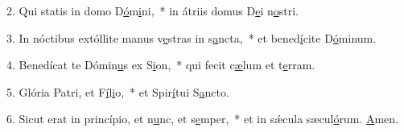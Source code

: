 2. Qui statis in domo D\uline{ó}m\uline{i}ni,~* in átriis domus D\uline{e}i n\uline{o}stri.\par 
3. In nóctibus extóllite manus v\uline{e}stras in s\uline{a}ncta,~* et bened\uline{í}cite D\uline{ó}minum.\par 
4. Benedícat te Dómin\uline{u}s ex S\uline{i}on,~* qui fecit c\uline{æ}lum et t\uline{e}rram.\par 
5. Glória Patri, et F\uline{í}l\uline{i}o,~* et Spir\uline{í}tui S\uline{a}ncto.\par 
6. Sicut erat in princípio, et n\uline{u}nc, et s\uline{e}mper,~* et in sǽcula sæcul\uline{ó}rum. \uline{A}men.\par 
